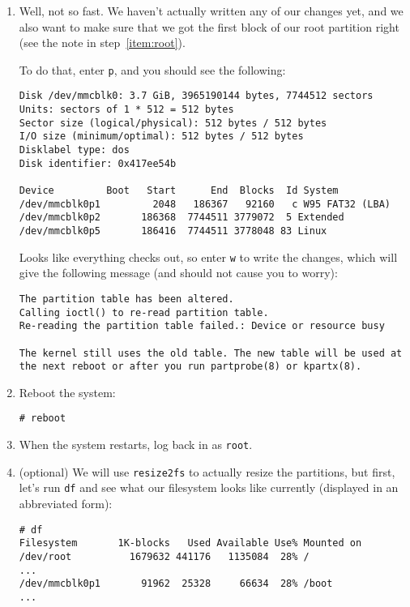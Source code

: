 \documentclass[12pt,letterpaper]{article}
\begin{document}
\begin{enumerate}
\item Well, not so fast.  We haven't actually written any of our changes yet, and we also want to make sure that we got the first block of our root partition right (see the note in step~\ref{item:root}).

To do that, enter \lstinline{p}, and you should see the following:
\begin{lstlisting}[basicstyle=\ttfamily\footnotesize]
Disk /dev/mmcblk0: 3.7 GiB, 3965190144 bytes, 7744512 sectors
Units: sectors of 1 * 512 = 512 bytes
Sector size (logical/physical): 512 bytes / 512 bytes
I/O size (minimum/optimal): 512 bytes / 512 bytes
Disklabel type: dos
Disk identifier: 0x417ee54b

Device         Boot   Start      End  Blocks  Id System
/dev/mmcblk0p1         2048   186367   92160   c W95 FAT32 (LBA)
/dev/mmcblk0p2       186368  7744511 3779072  5 Extended
/dev/mmcblk0p5       186416  7744511 3778048 83 Linux
\end{lstlisting}
Looks like everything checks out, so enter \lstinline{w} to write the changes, which will give the following message (and should not cause you to worry):
\begin{lstlisting}
The partition table has been altered.
Calling ioctl() to re-read partition table.
Re-reading the partition table failed.: Device or resource busy

The kernel still uses the old table. The new table will be used at the next reboot or after you run partprobe(8) or kpartx(8).
\end{lstlisting}

\item Reboot the system:
\begin{lstlisting}
# reboot
\end{lstlisting}

\item When the system restarts, log back in as \lstinline{root}.

\item (optional) We will use \lstinline{resize2fs} to actually resize the partitions, but first, let's run \lstinline{df} and see what our filesystem looks like currently (displayed in an abbreviated form):
\begin{lstlisting}[basicstyle=\ttfamily\scriptsize]
# df
Filesystem       1K-blocks   Used Available Use% Mounted on
/dev/root          1679632 441176   1135084  28% /
...
/dev/mmcblk0p1       91962  25328     66634  28% /boot
...
\end{lstlisting}


\end{enumerate}
\end{document}
